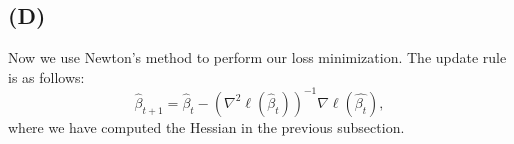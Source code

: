 \documentclass[a4paper,11pt]{article}
\begin{document}
\subsection{(D)}

Now we use Newton's method to perform our loss minimization. The update rule is as follows:
$$
	\hat{\beta}_{t+1} = \hat{\beta}_t - (\nabla^2\ell(\hat{\beta}_t))^{-1}\nabla\ell(\hat{\beta_t}),
$$
where we have computed the Hessian in the previous subsection.



%
%
\end{document}
